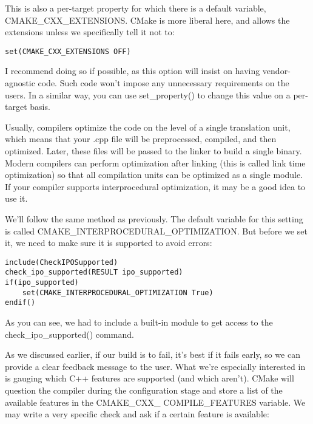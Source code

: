 This is also a per-target property for which there is a default variable, CMAKE\_CXX\_EXTENSIONS. CMake is more liberal here, and allows the extensions unless we specifically tell it not to:

\begin{lstlisting}[style=styleCMake]
set(CMAKE_CXX_EXTENSIONS OFF)
\end{lstlisting}

I recommend doing so if possible, as this option will insist on having vendor-agnostic code. Such code won't impose any unnecessary requirements on the users. In a similar way, you can use set\_property() to change this value on a per-target basis.


Usually, compilers optimize the code on the level of a single translation unit, which means that your .cpp file will be preprocessed, compiled, and then optimized. Later, these files will be passed to the linker to build a single binary. Modern compilers can perform optimization after linking (this is called link time optimization) so that all compilation units can be optimized as a single module. If your compiler supports interprocedural optimization, it may be a good idea to use it.

We'll follow the same method as previously. The default variable for this setting is called CMAKE\_INTERPROCEDURAL\_OPTIMIZATION. But before we set it, we need to make sure it is supported to avoid errors:

\begin{lstlisting}[style=styleCMake]
include(CheckIPOSupported)
check_ipo_supported(RESULT ipo_supported)
if(ipo_supported)
	set(CMAKE_INTERPROCEDURAL_OPTIMIZATION True)
endif()
\end{lstlisting}

As you can see, we had to include a built-in module to get access to the check\_ipo\_supported() command.


As we discussed earlier, if our build is to fail, it's best if it fails early, so we can provide a clear feedback message to the user. What we're especially interested in is gauging which C++ features are supported (and which aren't). CMake will question the compiler during the configuration stage and store a list of the available features in the CMAKE\_CXX\_ COMPILE\_FEATURES variable. We may write a very specific check and ask if a certain feature is available:

